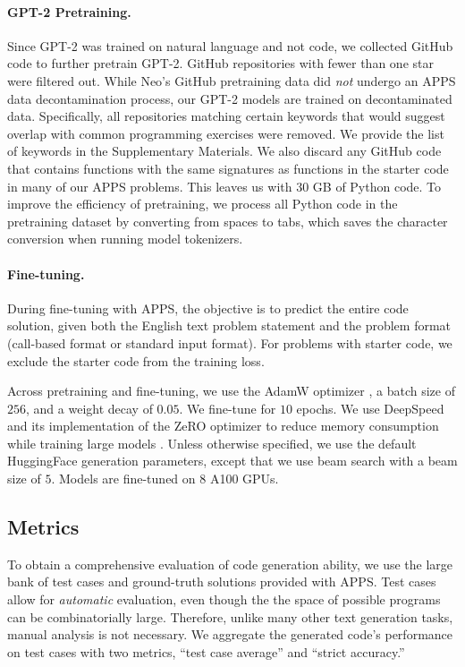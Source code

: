 \documentclass{article}
\begin{document}
\paragraph{GPT-2 Pretraining.}
Since GPT-2 was trained on natural language and not code, we collected GitHub code to further pretrain GPT-2. GitHub repositories with fewer than one star were filtered out.
While Neo's GitHub pretraining data did \emph{not} undergo an APPS data decontamination process, our GPT-2 models are trained on decontaminated data.
Specifically, all repositories matching certain keywords that would suggest overlap with common programming exercises were removed. We provide the list of keywords in the Supplementary Materials. We also discard any GitHub code that contains functions with the same signatures as functions in the starter code in many of our APPS problems. This leaves us with 30 GB of Python code. To improve the efficiency of pretraining, we process all Python code in the pretraining dataset by converting from spaces to tabs, which saves the character conversion when running model tokenizers.



\paragraph{Fine-tuning.}
During fine-tuning with APPS, the objective is to predict the entire code solution, given both the English text problem statement and the problem format (call-based format or standard input format). For problems with starter code, we exclude the starter code from the training loss.


Across pretraining and fine-tuning, we use the AdamW optimizer \citep{Loshchilov2019DecoupledWD}, a batch size of $256$, and a weight decay of $0.05$. We fine-tune for $10$ epochs. We use DeepSpeed and its implementation of the ZeRO optimizer to reduce memory consumption while training large models \citep{Rasley2020DeepSpeedSO, rajbhandari2020zero}. Unless otherwise specified, we use the default HuggingFace generation parameters, except that we use beam search with a beam size of $5$. Models are fine-tuned on 8 A100 GPUs.


\subsection{Metrics}
To obtain a comprehensive evaluation of code generation ability, we use the large bank of test cases and ground-truth solutions provided with APPS. Test cases allow for \emph{automatic} evaluation, even though the the space of possible programs can be combinatorially large. Therefore, unlike many other text generation tasks, manual analysis is not necessary. We aggregate the generated code's performance on test cases with two metrics, ``test case average'' and ``strict accuracy.'' 
\end{document}
